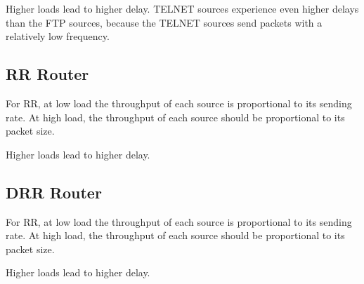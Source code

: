 Higher loads lead to higher delay.
TELNET sources experience even higher delays than the FTP sources, because the TELNET sources send packets with a relatively low frequency.


\newpage
\subsection{RR Router}

For RR, at low load the throughput of each source is proportional to its sending rate.
At high load, the throughput of each source should be proportional to its packet size.

Higher loads lead to higher delay.


\newpage
\subsection{DRR Router}

For RR, at low load the throughput of each source is proportional to its sending rate.
At high load, the throughput of each source should be proportional to its packet size.

Higher loads lead to higher delay.

